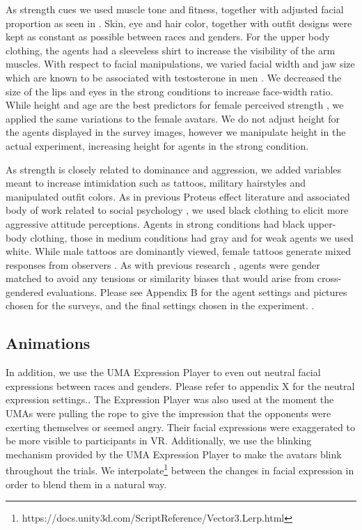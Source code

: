As strength cues we used muscle tone and fitness, together with adjusted facial proportion as seen in \cite{windhager2011geometric}. Skin, eye and hair color, together with outfit designs were kept as constant as possible between races and genders. For the upper body clothing, the agents had a sleeveless shirt to increase the visibility of the arm muscles. 
With respect to facial manipulations, we varied facial width and jaw size which are known to be associated with testosterone in men \cite{lefevre2013telling}. We decreased the size of the lips and eyes in the strong conditions to increase face-width ratio. While height and age are the best predictors for female perceived strength \cite{sell2008human}, we applied the same variations to the female avatars. We do not adjust height for the agents displayed in the survey images, however we manipulate height in the actual experiment, increasing height for agents in the strong condition.  

As strength is closely related to dominance and aggression, we added variables meant to increase intimidation such as tattoos, military hairstyles and manipulated outfit colors. As in previous Proteus effect literature and associated body of work related to social psychology \cite{yee2009proteus,pena2009priming}, we used black clothing to elicit more aggressive attitude perceptions. Agents in strong conditions had black upper-body clothing, those in medium conditions had gray and for weak agents we used white. While male tattoos are dominantly viewed, female tattoos generate mixed responses from observers \cite{wohlrab2009perception}. As with previous research \cite{van2013proteus}, agents were gender matched to avoid any tensions or similarity biases that would arise from cross-gendered evaluations. Please see Appendix B for the agent settings and pictures chosen for the surveys, and the final settings chosen in the experiment. .

\subsection{Animations}
 In addition, we use the UMA Expression Player to even out neutral facial expressions between races and genders. Please refer to appendix X for the neutral expression settings.. The Expression Player was also used at the moment the UMAs were pulling the rope to give the impression that the opponents were exerting themselves or seemed angry. Their facial expressions were exaggerated to be more visible to participants in VR. Additionally, we use the blinking mechanism provided by the UMA Expression Player to make the avatars blink throughout the trials. We interpolate\footnote{https://docs.unity3d.com/ScriptReference/Vector3.Lerp.html} between the changes in facial expression in order to blend them in a natural way.
 
